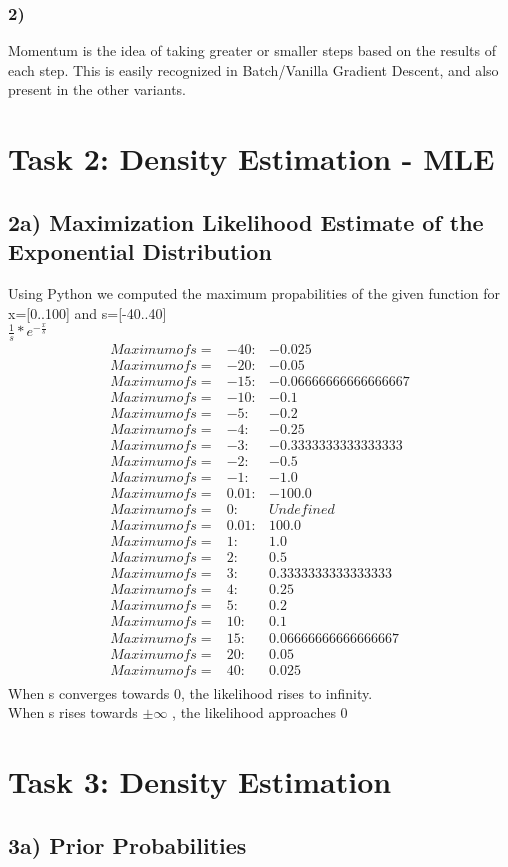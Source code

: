 \documentclass{article}
\begin{document}
\subsubsection{2)}
	Momentum is the idea of taking greater or smaller steps based on the results of each step. This is easily recognized in Batch/Vanilla Gradient Descent, and also present in the other variants.
	
\section{Task 2: Density Estimation - MLE}
\subsection{2a) Maximization Likelihood Estimate of the Exponential Distribution}
	Using Python we computed the maximum propabilities of the given function for x=[0..100] and s=[-40..40]\\
	$\frac{1}{s} * e^{-\frac{x}{s} }$		\\
	\begin{align*}
	Maximum of s= &-40 : & -0.025\\
	Maximum of s= &-20 : & -0.05\\
	Maximum of s= &-15 : & -0.06666666666666667\\
	Maximum of s= &-10 : & -0.1\\
	Maximum of s= &-5 :  &-0.2\\
	Maximum of s= &-4 :  &-0.25\\
	Maximum of s= &-3 :  &-0.3333333333333333\\
	Maximum of s= &-2 :  &-0.5\\
	Maximum of s= &-1 :  &-1.0\\
	Maximum of s= &0.01 : & -100.0\\
	Maximum of s= &0 :  &Undefined\\
	Maximum of s= &0.01 :&  100.0\\
	Maximum of s= &1 :  &1.0\\
	Maximum of s= &2 :  &0.5\\
	Maximum of s= &3 :  &0.3333333333333333\\
	Maximum of s= &4 :  &0.25\\
	Maximum of s= &5 :  &0.2\\
	Maximum of s= &10 :  &0.1\\
	Maximum of s= &15 :  &0.06666666666666667\\
	Maximum of s= &20 :  &0.05\\
	Maximum of s= &40 :  &0.025\\
	\end{align*}
	When s converges towards 0, the likelihood rises to infinity.\\
	When s rises towards $\pm\infty$ , the likelihood approaches 0
	
\section{Task 3: Density Estimation}
\subsection{3a) Prior Probabilities}
\end{document}
